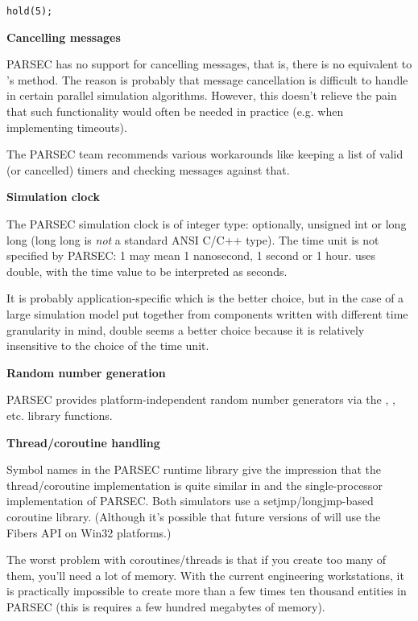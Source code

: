 \begin{verbatim}
hold(5);
\end{verbatim}

\textbf{Cancelling messages}


PARSEC has no support for cancelling messages, that is, there
is no equivalent to {\opp}'s  method. The reason
is probably that message cancellation is difficult to handle
in certain parallel simulation algorithms. However, this doesn't
relieve the pain that such functionality would often be needed
in practice (e.g. when implementing timeouts).


The PARSEC team recommends various workarounds like keeping a
list of valid (or cancelled) timers and checking messages against
that.


\textbf{Simulation clock}


The PARSEC simulation clock is of integer type: optionally, unsigned
int or long long (long long is \textit{not} a standard ANSI C/C++ type).
The time unit is not specified by PARSEC: 1 may mean 1 nanosecond,
1 second or 1 hour. {\opp} uses double, with the time value
to be interpreted as seconds.

It is probably application-specific which is the better choice,
but in the case of a large simulation model put together from
components written with different time granularity in mind, double
seems a better choice because it is relatively insensitive to
the choice of the time unit.


\textbf{Random number generation}


PARSEC provides platform-independent random number generators
via the , , etc. library functions.


\textbf{Thread/coroutine handling}


Symbol names in the PARSEC runtime library give the impression
that the thread/coroutine implementation is quite similar in
{\opp} and the single-processor implementation of PARSEC. Both
simulators use a setjmp/longjmp-based coroutine library. (Although
it's possible that future versions of {\opp} will use the Fibers
API on Win32 platforms.)


The worst problem with coroutines/threads is that if you create
too many of them, you'll need a lot of memory. With the current
engineering workstations, it is practically impossible to create
more than a few times ten thousand entities in PARSEC (this is
requires a few hundred megabytes of memory).

